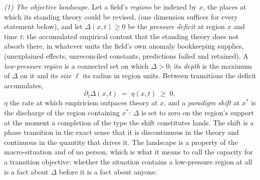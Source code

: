 \documentclass{article}
\begin{document}
\emph{(1) The objective landscape.} Let a field's \emph{regions} be indexed by $x$, the places at which its standing theory could be revised, (one dimension suffices for every statement below), and let $\Delta(x,t) \geq 0$ be the \emph{pressure deficit} at region $x$ and time $t$: the accumulated empirical content that the standing theory does not absorb there, in whatever units the field's own anomaly bookkeeping supplies, (unexplained effects, unreconciled constants, predictions failed and retained). A \emph{low-pressure region} is a connected set on which $\Delta > 0$; its \emph{depth} is the maximum of $\Delta$ on it and its \emph{size} $\ell$ its radius in region units. Between transitions the deficit accumulates,
\begin{equation}\label{eq:accumulate}
  \partial_t \Delta(x,t) \;=\; \eta(x,t) \;\geq\; 0,
\end{equation}
$\eta$ the rate at which empiricism outpaces theory at $x$, and a \emph{paradigm shift} at $x^\ast$ is the discharge of the region containing $x^\ast$: $\Delta$ is set to zero on the region's support at the moment a completion of the type the shift constitutes lands. The shift is a phase transition in the exact sense that it is discontinuous in the theory and continuous in the quantity that drives it. The landscape is a property of the macro-situation and of no person, which is what it means to call the capacity for a transition objective: whether the situation contains a low-pressure region at all is a fact about $\Delta$ before it is a fact about anyone.
\end{document}
